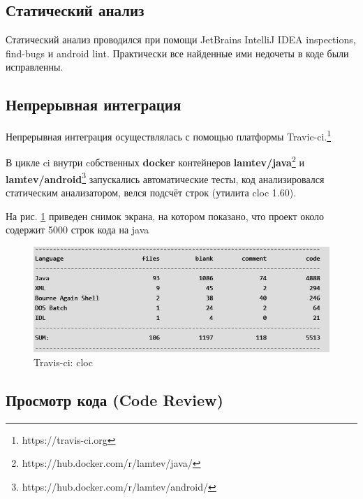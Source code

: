 \subsection*{Статический анализ}

Статический анализ проводился при помощи JetBrains IntelliJ IDEA inspections, find-bugs и android lint. Практически все найденные ими недочеты в коде были исправленны.

\subsection*{Непрерывная интеграция}

Непрерывная интеграция осуществлялась с помощью платформы Travic-ci.\footnote{https://travis-ci.org}
	
В цикле ci внутри cобственных \textbf{docker} контейнеров \textbf{lamtev/java}\footnote{https://hub.docker.com/r/lamtev/java/} и \textbf{lamtev/android}\footnote{https://hub.docker.com/r/lamtev/android/} запускались автоматические тесты, код анализировался статическим анализатором, велся подсчёт строк (утилита cloc 1.60).

На рис. \ref{pic:travis:3} приведен снимок экрана, на котором показано, что проект около содержит 5000 строк кода на java

\begin{figure}[H]
	\begin{center}
		\includegraphics[scale=0.75]{pics/travis2.png}
	    \caption{Travis-ci: cloc} 
		\label{pic:travis:3}
	\end{center}
\end{figure}

\subsection*{Просмотр кода (Code Review)}

